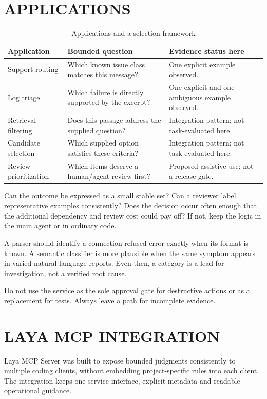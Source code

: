\documentclass[10pt,a4paper]{article}
\begin{document}
\section{APPLICATIONS}
\begin{table}[H]
\centering\small
\renewcommand{\arraystretch}{1.15}
\begin{tabularx}{\linewidth}{@{}YYY@{}}
\toprule
\textbf{Application} & \textbf{Bounded question} & \textbf{Evidence status here} \\
\midrule
Support routing & Which known issue class matches this message? & One explicit example observed. \\
Log triage & Which failure is directly supported by the excerpt? & One explicit and one ambiguous example observed. \\
Retrieval filtering & Does this passage address the supplied question? & Integration pattern; not task-evaluated here. \\
Candidate selection & Which supplied option satisfies these criteria? & Integration pattern; not task-evaluated here. \\
Review prioritization & Which items deserve a human/agent review first? & Proposed assistive use; not a release gate. \\
\bottomrule
\end{tabularx}
\caption{Applications and a selection framework}
\end{table}
Can the outcome be expressed as a small stable set? Can a reviewer label representative examples consistently? Does the decision occur often enough that the additional dependency and review cost could pay off? If not, keep the logic in the main agent or in ordinary code.

A parser should identify a connection-refused error exactly when its format is known. A semantic classifier is more plausible when the same symptom appears in varied natural-language reports. Even then, a category is a lead for investigation, not a verified root cause.

Do not use the service as the sole approval gate for destructive actions or as a replacement for tests. Always leave a path for incomplete evidence.

\section{LAYA MCP INTEGRATION}
Laya MCP Server was built to expose bounded judgments consistently to multiple coding clients, without embedding project-specific rules into each client. The integration keeps one service interface, explicit metadata and readable operational guidance. \cite{r2,r5,r6}
\end{document}
